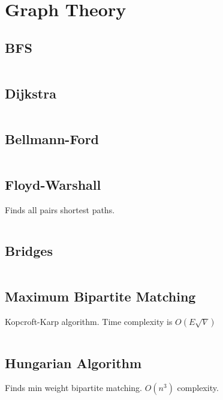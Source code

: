 \documentclass[8pt,a4paper,landscape,oneside]{amsart}
\newcommand{\code}[1]{\inputminted[fontsize=\normalsize,baselinestretch=1]{cpp}{_code/#1}}
\begin{document}
\begin{multicols*}{3}
	\code{data-structures/suffix_automaton.cpp}

\section{Graph Theory}

	\subsection{BFS}

	\code{graphs/bfs.cpp}

	\subsection{Dijkstra}
	
	\code{graphs/dijkstra.cpp}

	\subsection{Bellmann-Ford}

	\code{graphs/bellman_ford.cpp}

	\subsection{Floyd-Warshall}
	
	Finds all pairs shortest paths.
	
	\code{graphs/floyd_warshall.cpp}
	
	\subsection{Bridges}
	
	\code{graphs/bridges.cpp}

	\subsection{Maximum Bipartite Matching}
	
	Kopcroft-Karp algorithm. Time complexity is $O(E\sqrt{V})$
	
	\code{graphs/bipartite_matching.cpp}
	
	\subsection{Hungarian Algorithm}
	
	Finds min weight bipartite matching. $O(n^3)$ complexity.
	

\end{multicols*}
\end{document}
